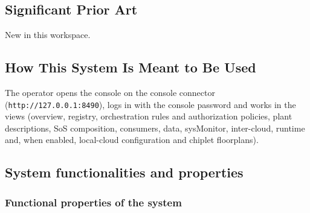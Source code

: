 \documentclass[a4paper]{arrowhead}
\begin{document}
\newpage

\subsection{Significant Prior Art}
\label{sec:prior_art}

New in this workspace.

\subsection{How This System Is Meant to Be Used}
\label{sec:use}

The operator opens the console on the console connector (\texttt{http:\allowbreak{}/\allowbreak{}/\allowbreak{}127.\allowbreak{}0.\allowbreak{}0.\allowbreak{}1:\allowbreak{}8490}), logs in with the console password and works in the views (overview, registry, orchestration rules and authorization policies, plant descriptions, SoS composition, consumers, data, sysMonitor, inter-cloud, runtime and, when enabled, local-cloud configuration and chiplet floorplans).

\subsection{System functionalities and properties}
\label{sec:properties}

\subsubsection{Functional properties of the system}
\end{document}
